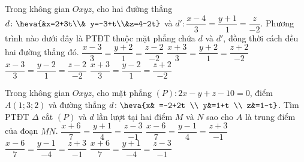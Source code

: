 \begin{ex}%
	Trong không gian $Oxyz$, cho hai đường thẳng $d\colon \heva{&x=2+3t\\& y=-3+t\\&z=4-2t}$ và $d'\colon \dfrac{x-4}{3}=\dfrac{y+1}{1}=\dfrac{z}{-2}$. Phương trình nào dưới đây là PTĐT thuộc mặt phẳng chứa $d$ và $d'$, đồng thời cách đều hai đường thẳng đó.
	\choice
	{\True  $\dfrac{x-3}{3}=\dfrac{y+2}{1}=\dfrac{z-2}{-2}$}
	{$\dfrac{x+3}{3}=\dfrac{y+2}{1}=\dfrac{z+2}{-2}$}
	{$\dfrac{x-3}{3}=\dfrac{y-2}{1}=\dfrac{z-2}{-2}$}
	{$\dfrac{x+3}{3}=\dfrac{y-2}{1}=\dfrac{z+2}{-2}$}
\end{ex}
\begin{ex}%
	Trong không gian $Oxyz$, cho mặt phẳng $\left(P\right) \colon 2x-y+z-10=0$, điểm $A\left(1 ; 3 ; 2\right)$ và đường thẳng $d \colon \heva{x& =-2+2t \\ y&=1+t \\ z&=1-t}$. Tìm PTĐT $\Delta $ cắt $\left(P\right)$ và $d$ lần lượt tại hai điểm $M$ và $N$ sao cho $A$ là trung điểm của đoạn $MN$. 
	\choice 
	{\True $\dfrac{x+6}{7} =\dfrac{y+1}{4} =\dfrac{z-3}{-1} $}
	{$\dfrac{x-6}{7} =\dfrac{y-1}{4} =\dfrac{z+3}{-1} $}
	{$\dfrac{x-6}{7} =\dfrac{y-1}{-4} =\dfrac{z+3}{-1} $}
	{$\dfrac{x+6}{7} =\dfrac{y+1}{-4} =\dfrac{z-3}{-1} $} 
\end{ex} 
